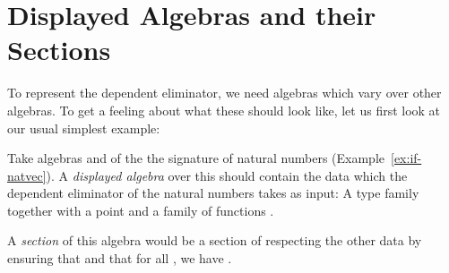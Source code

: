 %


\section{Displayed Algebras and their Sections}\label{sec:if-ds}

To represent the dependent eliminator, we need algebras which vary over other
algebras.
To get a feeling about what these should look like, let us first look at our
usual simplest example:

\begin{example}\label{ex:if-ds-nat}
Take algebras  and
 of
the the signature of natural numbers (Example~\ref{ex:if-natvec}).
A \emph{displayed algebra} over this should contain the data which the dependent
eliminator of the natural numbers takes as input:
A type family  together with a point 
and a family of functions .

A \emph{section} of this algebra would be a section  of
 respecting the other data by ensuring that 
and that for all , we have .
\end{example}

